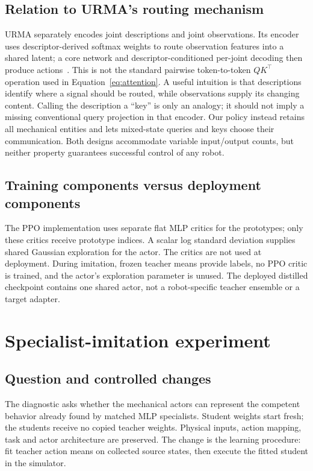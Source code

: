 \documentclass[11pt,letterpaper]{article}
\begin{document}
\subsection{Relation to URMA's routing mechanism}
URMA separately encodes joint descriptions and joint observations. Its encoder
uses descriptor-derived softmax weights to route observation features into a
shared latent; a core network and descriptor-conditioned per-joint decoding then
produce actions~\cite{urma}. This is not the standard pairwise token-to-token
$QK^\top$ operation used in Equation~\eqref{eq:attention}. A useful intuition is
that descriptions identify where a signal should be routed, while observations
supply its changing content. Calling the description a ``key'' is only an
analogy; it should not imply a missing conventional query projection in that
encoder. Our policy instead retains all mechanical entities and lets mixed-state
queries and keys choose their communication. Both designs accommodate variable
input/output counts, but neither property guarantees successful control of any
robot.

\subsection{Training components versus deployment components}
The PPO implementation uses separate flat MLP critics for the prototypes; only
these critics receive prototype indices. A scalar log standard deviation supplies
shared Gaussian exploration for the actor. The critics are not used at
deployment. During imitation, frozen teacher means provide labels, no PPO critic
is trained, and the actor's exploration parameter is unused. The deployed
distilled checkpoint contains one shared actor, not a robot-specific teacher
ensemble or a target adapter.

\section{Specialist-imitation experiment}
\label{sec:protocol}

\subsection{Question and controlled changes}
The diagnostic asks whether the mechanical actors can represent the competent
behavior already found by matched MLP specialists. Student weights start fresh;
the students receive no copied teacher weights. Physical inputs, action mapping,
task and actor architecture are preserved. The change is the learning procedure:
fit teacher action means on collected source states, then execute the fitted
student in the simulator.
\end{document}
